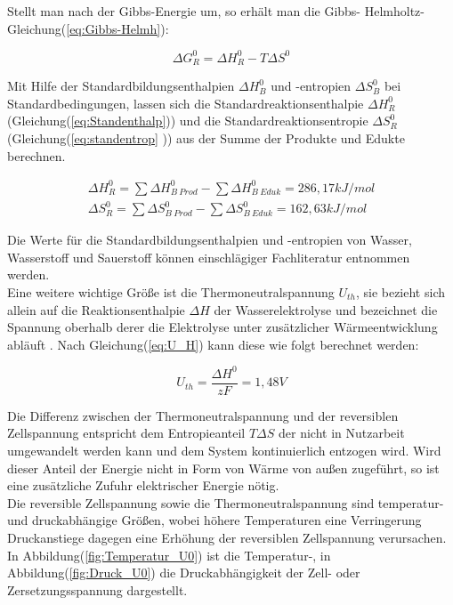 \documentclass[onecolumn,10pt,titlepage]{article}
\begin{document}
	Stellt man nach der Gibbs-Energie um, so erhält man die Gibbs-
	Helmholtz-Gleichung(\ref{eq:Gibbs-Helmh}):\cite{Bayer.2000}

	\begin{equation}
	\Delta G_R^0 =\Delta H_R^0 - T\Delta S^0
	\label{eq:Gibbs-Helmh}
	\end{equation}

	Mit Hilfe der Standardbildungsenthalpien $\Delta H_B^0$ und -entropien $\Delta S_B^0$ bei Standardbedingungen, lassen sich die Standardreaktionsenthalpie $\Delta H_R^0$ (Gleichung(\ref{eq:Standenthalp})) und die Standardreaktionsentropie $\Delta S_R^0$ (Gleichung(\ref{eq:standentrop}
	)) aus der Summe der Produkte und Edukte berechnen.

	\begin{align}
	\Delta H_R^0 =\sum{\Delta H_{B~Prod}^0}-\sum{\Delta H_{B~Eduk}^0} =286,17 kJ/mol \label{eq:Standenthalp}\\
	\Delta S_R^0 =\sum{\Delta S_{B~Prod}^0}-\sum{\Delta S_{B~Eduk}^0} = 162,63 kJ/mol \label{eq:standentrop}
	\end{align}


	Die Werte für die Standardbildungsenthalpien und -entropien von Wasser, Wasserstoff und Sauerstoff können einschlägiger Fachliteratur entnommen werden.\\
	Eine weitere wichtige Größe ist die Thermoneutralspannung $U_{th}$, sie bezieht sich allein auf die Reaktionsenthalpie $\Delta H$ der Wasserelektrolyse und bezeichnet die Spannung oberhalb derer die Elektrolyse unter zusätzlicher Wärmeentwicklung abläuft \cite{Kurzweil.2015}. Nach Gleichung(\ref{eq:U_H}) kann diese wie folgt berechnet werden:

	\begin{equation}
	U_{th} = \frac{\Delta H^0}{zF} = 1,48 V
	\label{eq:U_H}
	\end{equation}

	Die Differenz zwischen der Thermoneutralspannung und der reversiblen Zellspannung entspricht dem Entropieanteil $T\Delta S$ der nicht in Nutzarbeit umgewandelt werden kann und dem System kontinuierlich entzogen wird. Wird dieser Anteil der Energie nicht in Form von Wärme von außen zugeführt, so ist eine zusätzliche Zufuhr elektrischer Energie nötig.\\
	Die reversible Zellspannung sowie die Thermoneutralspannung sind temperatur- und druckabhängige Größen, wobei höhere Temperaturen eine Verringerung Druckanstiege dagegen eine Erhöhung der reversiblen Zellspannung verursachen. In Abbildung(\ref{fig:Temperatur_U0}) ist die Temperatur-, in Abbildung(\ref{fig:Druck_U0}) die Druckabhängigkeit der Zell- oder Zersetzungsspannung dargestellt.\cite{Kurzweil.2015}
\end{document}
